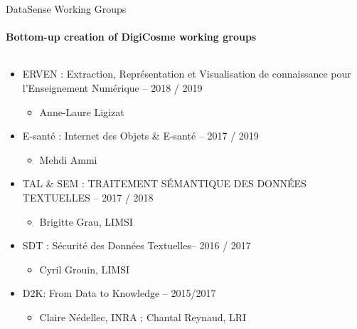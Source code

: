 \begin{frame}{DataSense Working Groups}
  \framesubtitle{Bottom-up creation of DigiCosme working groups}
  \vspace*{-8mm}


  \footnotesize
  \begin{columns}

    \begin{column}[t]{6cm}
      \begin{itemize}

       \item ERVEN : Extraction, Représentation et Visualisation de connaissance pour
l'Enseignement Numérique -- 2018 / 2019
        \begin{itemize}
        \item Anne-Laure Ligizat
        \end{itemize}

        \item E-santé : Internet des Objets \& E-santé -- 2017 / 2019
        \begin{itemize}
        \item Mehdi Ammi
        \end{itemize}

        \item TAL \& SEM : TRAITEMENT SÉMANTIQUE DES DONNÉES TEXTUELLES -- 2017 / 2018
        \begin{itemize}
        \item  Brigitte Grau, LIMSI
        \end{itemize}

        \item SDT : Sécurité des Données Textuelles-- 2016 / 2017
        \begin{itemize}
        \item Cyril Grouin, LIMSI
        \end{itemize}

      \item D2K: From Data to Knowledge -- 2015/2017
        \begin{itemize}
        \item Claire Nédellec, INRA ; Chantal Reynaud, LRI 
        \end{itemize}


\end{itemize}
\end{column}
\end{columns}
\end{frame}
